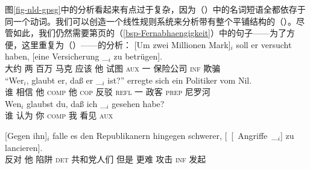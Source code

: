 图\ref{fig-nld-gpsg}中的分析看起来有点过于复杂，因为（）中的名词短语全都依存于同一个动词。我们可以创造一个线性规则系统来分析带有整个平铺结构的（）。尽管如此，我们仍然需要第\pageref{bsp-Fernabhaengigkeit}页的（\ref{bsp-Fernabhaengigkeit}）中的句子——为了方便，这里重复为（）——的分析：
\eal
\ex\label{bsp-um-zwei-millionen-zwei}
\gll {}[Um zwei Millionen Mark]$_i$ soll er versucht haben, [eine Versicherung \_$_i$ zu betrügen].\footnotemark\\
       {}\spacebr{}大约 两 百万 马克 应该 他 试图 \textsc{aux} \spacebr{}一 保险公司 {} \textsc{inf} 欺骗\\
\ex
\gll "`Wer$_i$, glaubt er, daß er \_$_i$ ist?"' erregte sich ein Politiker vom Nil.\footnotemark\\
    \spacebr{}谁 相信 他 \textsc{comp} 他 {} \textsc{cop} 反驳 \textsc{refl} 一 政客 \textsc{prep} 尼罗河\\
\ex\label{ex-wen-glaubst-du-dass-zwei}
\gll Wen$_i$ glaubst du, daß ich \_$_i$ gesehen habe?\footnotemark\\
     谁 认为 你 \textsc{comp} 我 {} 看见 \textsc{aux}\\
\ex
{\raggedright
\gll {}[Gegen ihn]$_i$ falle es den Republikanern hingegen schwerer, [~[~Angriffe~\_$_i$] zu lancieren].\footnotemark\\
	 {}\spacebr{}反对 他 陷阱 \expl{} \textsc{det} 共和党人们 但是 更难
         \hspaceThis{[~[~}攻击 \textsc{inf} 发起\\
\par}
